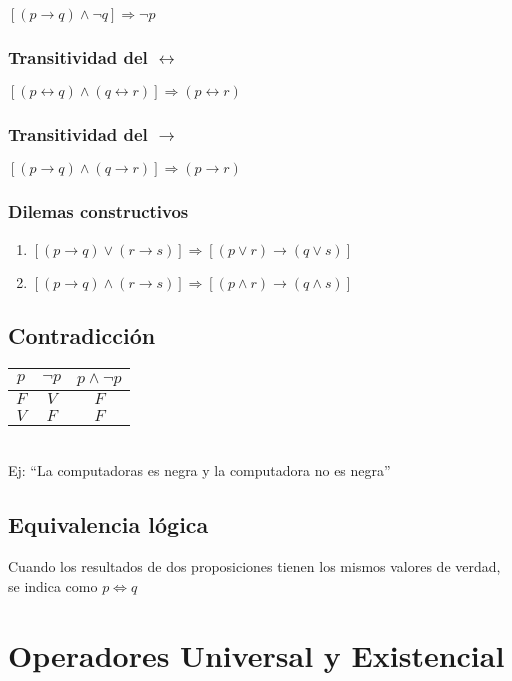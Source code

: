     $[(p \rightarrow q) \wedge \neg q] \Rightarrow \neg p$
  
    \subsubsection{Transitividad del $\leftrightarrow $}

    $[(p \leftrightarrow q) \wedge (q \leftrightarrow r)] \Rightarrow (p \leftrightarrow r)$

    \subsubsection{Transitividad del $\rightarrow $}

    $[(p \rightarrow q) \wedge (q \rightarrow r)] \Rightarrow (p \rightarrow r)$

    \subsubsection{Dilemas constructivos}
      \renewcommand{\labelenumi}{\alph{enumi})}
	\begin{enumerate}
	  \item $[(p \rightarrow q) \vee (r \rightarrow s)] \Rightarrow [(p \vee r) \rightarrow (q \vee s)]$

	  \item $[(p \rightarrow q) \wedge (r \rightarrow s)] \Rightarrow [(p \wedge r) \rightarrow (q \wedge s)]$
	\end{enumerate}

  \subsection{Contradicci\'on}
	\begin{tabular}{ccc}
	$p$ & $\neg p$ & $p \wedge \neg p$ \\ \hline
	$F$ & $V$ & $F$ \\
	$V$ & $F$ &$F$ \\
      \end{tabular} \\
      Ej: ``La computadoras es negra y la computadora no es negra''
\subsection{Equivalencia l\'ogica}
Cuando los resultados de dos proposiciones tienen los mismos valores de verdad, se indica como $p \Leftrightarrow q$

\section{Operadores Universal y Existencial}

